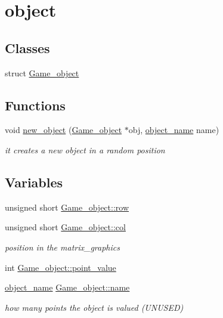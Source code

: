 \hypertarget{group__object}{}\section{object}
\label{group__object}
\subsection*{Classes}
\begin{DoxyCompactItemize}
\item 
struct \hyperlink{structGame__object}{Game\+\_\+object}
\end{DoxyCompactItemize}
\subsection*{Functions}
\begin{DoxyCompactItemize}
\item 
void \hyperlink{group__object_gaec22a837ae65e3ba7f3e55ad9c37c91d}{new\+\_\+object} (\hyperlink{structGame__object}{Game\+\_\+object} $\ast$obj, \hyperlink{group__object_ga90ab20efa1890ce46e743d7569ce7cec}{object\+\_\+name} name)
\begin{DoxyCompactList}\small\item\em it creates a new object in a random position \end{DoxyCompactList}\end{DoxyCompactItemize}
\subsection*{Variables}
\begin{DoxyCompactItemize}
\item 
unsigned short \hyperlink{group__object_ga41a0b70059db5a8364cb00caed5f7860}{Game\+\_\+object\+::row}
\item 
unsigned short \hyperlink{group__object_ga26747c58af9aac0a386f3be5b5302d23}{Game\+\_\+object\+::col}
\begin{DoxyCompactList}\small\item\em position in the matrix\+\_\+graphics \end{DoxyCompactList}\item 
int \hyperlink{group__object_gaa3e8af9c364161ddf47359bba651e9cf}{Game\+\_\+object\+::point\+\_\+value}
\item 
\hyperlink{group__object_ga90ab20efa1890ce46e743d7569ce7cec}{object\+\_\+name} \hyperlink{group__object_ga27d8ddc2e36ab28af25f9698f1b11e49}{Game\+\_\+object\+::name}
\begin{DoxyCompactList}\small\item\em how many points the object is valued (U\+N\+U\+S\+ED) \end{DoxyCompactList}\end{DoxyCompactItemize}
